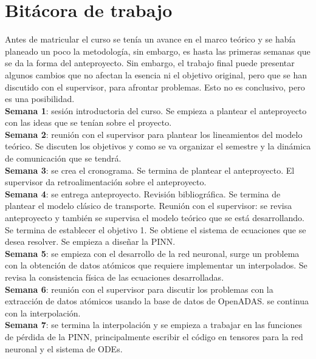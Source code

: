 \section{Bitácora de trabajo}

Antes de matricular el curso se tenía un avance en el marco teórico y se había planeado un poco la metodología, sin embargo, es hasta las primeras semanas que se da la forma del anteproyecto. Sin embargo, el trabajo final puede presentar algunos cambios que no afectan la esencia ni el objetivo original, pero que se han discutido con el supervisor, para afrontar problemas. Esto no es conclusivo, pero es una posibilidad.\\

\textbf{Semana 1}: sesión introductoria del curso. Se empieza a plantear el anteproyecto con las ideas que se tenían sobre el proyecto.\\

\textbf{Semana 2}: reunión con el supervisor para plantear los lineamientos del modelo teórico. Se discuten los objetivos y como se va organizar el semestre y la dinámica de comunicación que se tendrá.\\

\textbf{Semana 3}: se crea el cronograma. Se termina de plantear el anteproyecto. El supervisor da retroalimentación sobre el anteproyecto. \\

\textbf{Semana 4}:  se entrega anteproyecto. Revisión bibliográfica. Se termina de plantear el modelo clásico de transporte. Reunión con el supervisor: se revisa anteproyecto y también se supervisa el modelo teórico que se está desarrollando. Se termina de establecer el objetivo 1. Se obtiene el sistema de ecuaciones que se desea resolver. Se empieza a diseñar la PINN.\\ 

\textbf{Semana 5}:  se empieza con el desarrollo de la red neuronal, surge un problema con la obtención de datos atómicos que requiere implementar un interpolados. Se revisa la consistencia física de las ecuaciones desarrolladas.\\

\textbf{Semana 6}:  reunión con el supervisor para discutir los problemas con la extracción de datos atómicos usando la base de datos de OpenADAS. se continua con la interpolación.    \\

\textbf{Semana 7}: se termina la interpolación y se empieza a trabajar en las funciones de pérdida de la PINN, principalmente escribir el código en tensores para la red neuronal y el sistema de ODEs.\\

